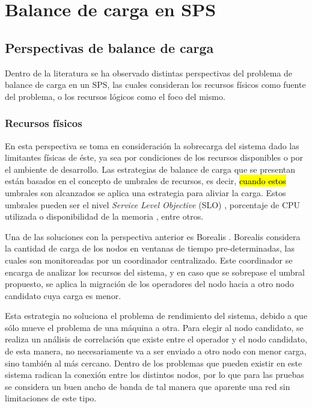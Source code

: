 \chapter{Balance de carga en SPS}
\label{cap:estadoDelArte}

\section{Perspectivas de balance de carga}
\label{sec:perspectivasBC}
Dentro de la literatura se ha observado distintas perspectivas del problema de balance de carga en un SPS, las cuales consideran los recursos físicos como fuente del problema, o los recursos lógicos como el foco del mismo.

\subsection{Recursos físicos}
\label{subsec:recFisicosBC}
En esta perspectiva se toma en consideración la sobrecarga del sistema dado las limitantes físicas de éste, ya sea por condiciones de los recursos disponibles o por el ambiente de desarrollo. Las estrategias de balance de carga que se presentan están basados en el concepto de umbrales de recursos, es decir, \hl{cuando estos} umbrales son alcanzados se aplica una estrategia para aliviar la carga. Estos umbrales pueden ser el nivel \textit{Service Level Objective} (SLO) \citep{sturm2000foundations}, porcentaje de CPU utilizada o disponibilidad de la memoria \citep{Dong06schedulingalgorithms}, entre otros.

Una de las soluciones con la perspectiva anterior es Borealis \citep{XingZH05}. Borealis considera la cantidad de carga de los nodos en ventanas de tiempo pre-determinadas, las cuales son monitoreadas por un coordinador centralizado. Este coordinador se encarga de analizar los recursos del sistema, y en caso que se sobrepase el umbral propuesto, se aplica la migración de los operadores del nodo hacia a otro nodo candidato cuya carga es menor.

Esta estrategia no soluciona el problema de rendimiento del sistema, debido a que sólo mueve el problema de una máquina a otra. Para elegir al nodo candidato, se realiza un análisis de correlación que existe entre el operador y el nodo candidato, de esta manera, no necesariamente va a ser enviado a otro nodo con menor carga, sino también al más cercano. Dentro de los problemas que pueden existir en este sistema radican la conexión entre los distintos nodos, por lo que para las pruebas se considera un buen ancho de banda de tal manera que aparente una red sin limitaciones de este tipo.

